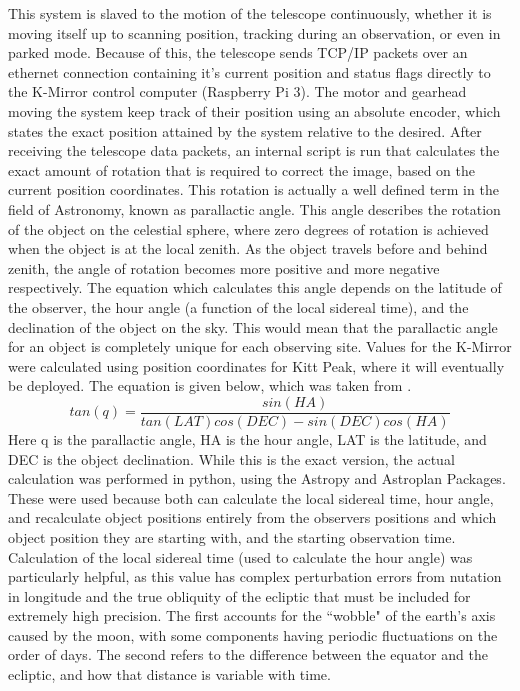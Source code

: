 \documentclass[manuscript]{aastex}
\begin{document}
This system is slaved to the motion of the telescope continuously, whether it is moving itself up to scanning position, tracking during an observation, or even in parked mode. Because of this, the telescope sends TCP/IP packets over an ethernet connection containing it's current position and status flags directly to the K-Mirror control computer (Raspberry Pi 3). The motor and gearhead moving the system keep track of their position using an absolute encoder, which states the exact position attained by the system relative to the desired. After receiving the telescope data packets, an internal script is run that calculates the exact amount of rotation that is required to correct the image, based on the current position coordinates. This rotation is actually a well defined term in the field of Astronomy, known as parallactic angle. This angle describes the rotation of the object on the celestial sphere, where zero degrees of rotation is achieved when the object is at the local zenith. As the object travels before and behind zenith, the angle of rotation becomes more positive and more negative respectively. The equation which calculates this angle depends on the latitude of the observer, the hour angle (a function of the local sidereal time), and the declination of the object on the sky. This would mean that the parallactic angle for an object is completely unique for each observing site. Values for the K-Mirror were calculated using position coordinates for Kitt Peak, where it will eventually be deployed. The equation is given below, which was taken from \cite{Meeus1998}.
\begin{equation}
tan(q) = \frac{sin(HA)}{tan(LAT)cos(DEC) - sin(DEC)cos(HA)}
\end{equation}
Here q is the parallactic angle, HA is the hour angle, LAT is the latitude, and DEC is the object declination. While this is the exact version, the actual calculation was performed in python, using the Astropy and Astroplan Packages. These were used because both can calculate the local sidereal time, hour angle, and recalculate object positions entirely from the observers positions and which object position they are starting with, and the starting observation time. Calculation of the local sidereal time (used to calculate the hour angle) was particularly helpful, as this value has complex perturbation errors from nutation in longitude and the true obliquity of the ecliptic that must be included for extremely high precision. The first accounts for the ``wobble" of the earth's axis caused by the moon, with some components having periodic fluctuations on the order of days. The second refers to the difference between the equator and the ecliptic, and how that distance is variable with time. 
\end{document}
